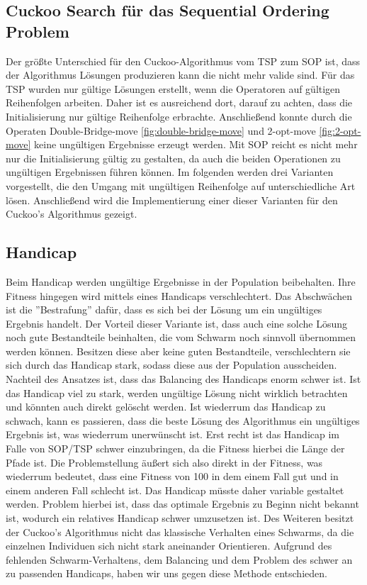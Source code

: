 \documentclass[conference]{IEEEtran}
\begin{document}
    \subsection{Cuckoo Search für das Sequential Ordering Problem}
      Der größte Unterschied für den Cuckoo-Algorithmus vom TSP zum SOP ist, dass der Algorithmus Lösungen 
      produzieren kann die nicht mehr valide sind. Für das TSP wurden nur gültige Lösungen erstellt, wenn die 
      Operatoren auf gültigen Reihenfolgen arbeiten. Daher ist es ausreichend dort, darauf zu achten, dass die Initialisierung 
      nur gültige Reihenfolge erbrachte. Anschließend konnte durch die Operaten Double-Bridge-move 
      \ref{fig:double-bridge-move} und 2-opt-move \ref{fig:2-opt-move} keine ungültigen Ergebnisse erzeugt werden.
      Mit SOP reicht es nicht mehr nur die Initialisierung gültig zu gestalten, da auch die 
      beiden Operationen zu ungültigen Ergebnissen führen können.
      Im folgenden werden drei Varianten vorgestellt, die den Umgang mit ungültigen Reihenfolge auf unterschiedliche
      Art lösen. Anschließend wird die Implementierung einer dieser Varianten für den Cuckoo's Algorithmus gezeigt. 

    \subsection{Handicap}
      Beim Handicap werden ungültige 
      Ergebnisse in der Population beibehalten. Ihre Fitness hingegen wird mittels eines Handicaps 
      verschlechtert. Das Abschwächen ist die ''Bestrafung'' dafür, dass es sich bei der 
      Lösung um ein ungültiges Ergebnis handelt. Der Vorteil dieser Variante ist, dass auch eine solche 
      Lösung noch gute Bestandteile beinhalten, die vom Schwarm noch sinnvoll übernommen werden können. 
      Besitzen diese aber keine guten Bestandteile, verschlechtern sie sich durch das Handicap stark, sodass diese aus der
      Population ausscheiden. Nachteil des Ansatzes ist, dass das Balancing des Handicaps 
      enorm schwer ist. Ist das Handicap viel zu stark, werden ungültige Lösung nicht wirklich 
      betrachten und könnten auch direkt gelöscht werden. Ist wiederrum das Handicap zu schwach, 
      kann es passieren, dass die beste Lösung des Algorithmus ein ungültiges Ergebnis ist, was 
      wiederrum unerwünscht ist. Erst recht ist das Handicap im Falle von SOP/TSP schwer 
      einzubringen, da die Fitness hierbei die Länge der Pfade ist. Die Problemstellung äußert 
      sich also direkt in der Fitness, was wiederrum bedeutet, dass eine Fitness von 100 in dem einem Fall
      gut und in einem anderen Fall schlecht ist. Das Handicap müsste daher variable gestaltet werden. Problem hierbei ist, 
      dass das optimale Ergebnis zu Beginn nicht 
      bekannt ist, wodurch ein relatives Handicap schwer umzusetzen ist. Des Weiteren besitzt der Cuckoo's Algorithmus
      nicht das klassische Verhalten eines Schwarms, da die einzelnen Individuen sich nicht stark aneinander Orientieren.
      Aufgrund des fehlenden Schwarm-Verhaltens, dem Balancing und dem Problem des schwer an zu passenden Handicaps, 
      haben wir uns gegen diese Methode entschieden.
\end{document}
